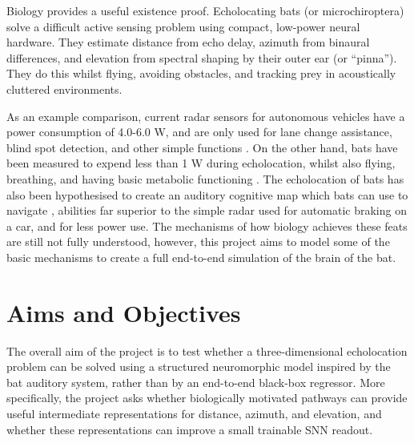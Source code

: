 Biology provides a useful existence proof. Echolocating bats (or microchiroptera) solve a difficult active sensing problem using compact, low-power neural hardware. They estimate distance from echo delay, azimuth from binaural differences, and elevation from spectral shaping by their outer ear (or ``pinna''). They do this whilst flying, avoiding obstacles, and tracking prey in acoustically cluttered environments.

As an example comparison, current radar sensors for autonomous vehicles have a power consumption of 4.0-6.0 W, and are only used for lane change assistance, blind spot detection, and other simple functions \cite{Rajashekara2024DataReview}. On the other hand, bats have been measured to expend less than 1 W during echolocation, whilst also flying, breathing, and having basic metabolic functioning \cite{Speakman1989ThePipistrellus}. The echolocation of bats has also been hypothesised to create an auditory cognitive map which bats can use to navigate \cite{Krishna2025AuditoryHippocampus}, abilities far superior to the simple radar used for automatic braking on a car, and for less power use. The mechanisms of how biology achieves these feats are still not fully understood, however, this project aims to model some of the basic mechanisms to create a full end-to-end simulation of the brain of the bat.

\section{Aims and Objectives}


The overall aim of the project is to test whether a three-dimensional echolocation problem can be solved using a structured neuromorphic model inspired by the bat auditory system, rather than by an end-to-end black-box regressor. More specifically, the project asks whether biologically motivated pathways can provide useful intermediate representations for distance, azimuth, and elevation, and whether these representations can improve a small trainable SNN readout.

